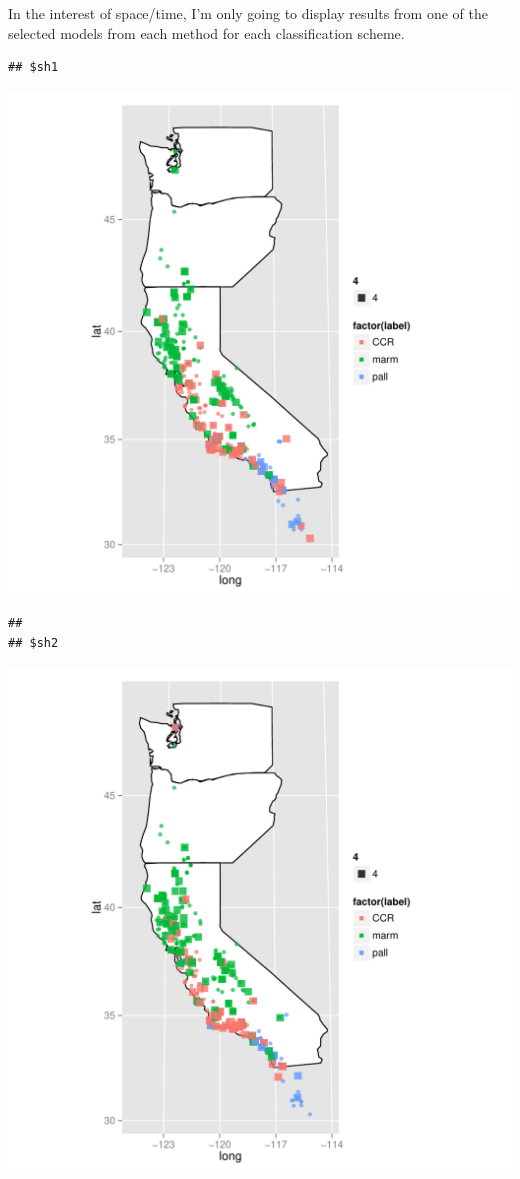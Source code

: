 \documentclass{article}\usepackage{graphicx, color}
\makeatletter
\def\maxwidth{ %
  \ifdim\Gin@nat@width>\linewidth
    \linewidth
  \else
    \Gin@nat@width
  \fi
}
\newenvironment{kframe}{%
 \def\at@end@of@kframe{}%
 \ifinner\ifhmode%
  \def\at@end@of@kframe{\end{minipage}}%
  \begin{minipage}{\columnwidth}%
 \fi\fi%
 \def\FrameCommand##1{\hskip\@totalleftmargin \hskip-\fboxsep
 \colorbox{shadecolor}{##1}\hskip-\fboxsep
     \hskip-\linewidth \hskip-\@totalleftmargin \hskip\columnwidth}%
 \MakeFramed {\advance\hsize-\width
   \@totalleftmargin\z@ \linewidth\hsize
   \@setminipage}}%
 {\par\unskip\endMakeFramed%
 \at@end@of@kframe}
\newenvironment{knitrout}{}{} %
\makeatother
\begin{document}
In the interest of space/time, I'm only going to display results from one of the selected models from each method for each classification scheme.

\begin{knitrout}
\color{fgcolor}\begin{kframe}
\begin{verbatim}
## $sh1
\end{verbatim}
\end{kframe}
\includegraphics[width=\maxwidth]{figure/multi-map1} 
\begin{kframe}\begin{verbatim}
## 
## $sh2
\end{verbatim}
\end{kframe}
\includegraphics[width=\maxwidth]{figure/multi-map2} 

\end{knitrout}
\end{document}
